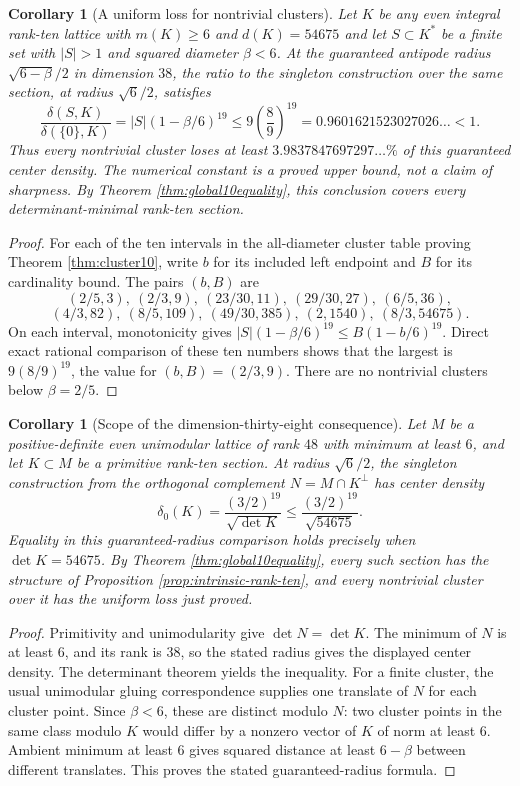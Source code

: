 \documentclass[11pt,a4paper]{article}
\newtheorem{corollary}[theorem]{Corollary}
\theoremstyle{remark}\newtheorem{remark}[theorem]{Remark}
\begin{document}
\begin{corollary}[A uniform loss for nontrivial clusters]
\label{cor:uniform-rank-ten-cluster-loss}
Let $K$ be any even integral rank-ten lattice with $m(K)\ge6$ and $d(K)=54675$ and let $S\subset K^*$
be a finite set with $|S|>1$ and squared diameter $\beta<6$.
At the guaranteed antipode radius $\sqrt{6-\beta}/2$ in dimension $38$,
the ratio to the singleton construction over the same section, at
radius $\sqrt6/2$, satisfies
\[
 \frac{\delta(S,K)}{\delta(\{0\},K)}
 =|S|(1-\beta/6)^{19}
 \le 9\left(\frac89\right)^{19}
 =0.9601621523027026\ldots<1.
\]
Thus every nontrivial cluster loses at least
$3.9837847697297\ldots\%$ of this guaranteed center density.
The numerical constant is a proved upper bound, not a claim of sharpness.
By Theorem \ref{thm:global10equality}, this conclusion covers every determinant-minimal rank-ten section.
\end{corollary}

\begin{proof}
For each of the ten intervals in the all-diameter cluster table proving Theorem \ref{thm:cluster10}, write $b$ for its included left endpoint and $B$ for its
cardinality bound. The pairs $(b,B)$ are
\[
 (2/5,3),\ (2/3,9),\ (23/30,11),\ (29/30,27),\ (6/5,36),
\]
\[
 (4/3,82),\ (8/5,109),\ (49/30,385),\ (2,1540),\ (8/3,54675).
\]
On each interval, monotonicity gives
$|S|(1-\beta/6)^{19}\le B(1-b/6)^{19}$.
Direct exact rational comparison of these ten numbers shows that the
largest is $9(8/9)^{19}$, the value for $(b,B)=(2/3,9)$.
There are no nontrivial clusters below $\beta=2/5$.
\end{proof}

\begin{corollary}[Scope of the dimension-thirty-eight consequence]
\label{cor:rank-ten-density-scope}
Let $M$ be a positive-definite even unimodular lattice of rank $48$
with minimum at least $6$, and let $K\subset M$ be a primitive
rank-ten section. At radius $\sqrt6/2$, the singleton construction
from the orthogonal complement $N=M\cap K^\perp$ has center density
\[
 \delta_0(K)=\frac{(3/2)^{19}}{\sqrt{\det K}}
 \le\frac{(3/2)^{19}}{\sqrt{54675}}.
\]
Equality in this guaranteed-radius comparison holds precisely when
$\det K=54675$. By Theorem \ref{thm:global10equality}, every such section has the structure of Proposition \ref{prop:intrinsic-rank-ten}, and every nontrivial
cluster over it has the uniform loss just proved.
\end{corollary}

\begin{proof}
Primitivity and unimodularity give $\det N=\det K$. The minimum of $N$
is at least $6$, and its rank is $38$, so the stated radius gives the
displayed center density. The determinant theorem yields the inequality.
For a finite cluster, the usual unimodular gluing correspondence supplies
one translate of $N$ for each cluster point. Since $\beta<6$, these are
distinct modulo $N$: two cluster points in the same class modulo $K$
would differ by a nonzero vector of $K$ of norm at least $6$.
Ambient minimum at least $6$ gives squared distance at least $6-\beta$ between
different translates. This proves the stated guaranteed-radius formula.
\end{proof}
\end{document}
